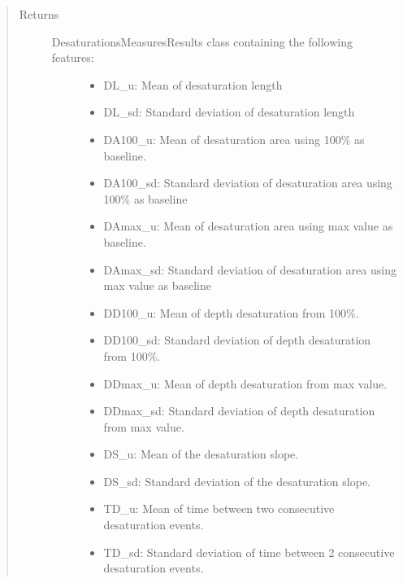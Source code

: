\documentclass[letterpaper,10pt,english]{sphinxmanual}
\begin{document}
\begin{fulllineitems}
\begin{fulllineitems}
\begin{quote}
\begin{description}
\item[{Returns}] \leavevmode
\begin{description}
\item[{DesaturationsMeasuresResults class containing the following features:}] \leavevmode\begin{itemize}
\item {} 
DL\_u: Mean of desaturation length

\item {} 
DL\_sd: Standard deviation of desaturation length

\item {} 
DA100\_u: Mean of desaturation area using 100\% as baseline.

\item {} 
DA100\_sd: Standard deviation of desaturation area using 100\% as baseline

\item {} 
DAmax\_u: Mean of desaturation area using max value as baseline.

\item {} 
DAmax\_sd: Standard deviation of desaturation area using max value as baseline

\item {} 
DD100\_u: Mean of depth desaturation from 100\%.

\item {} 
DD100\_sd: Standard deviation of depth desaturation from 100\%.

\item {} 
DDmax\_u: Mean of depth desaturation from max value.

\item {} 
DDmax\_sd: Standard deviation of depth desaturation from max value.

\item {} 
DS\_u: Mean of the desaturation slope.

\item {} 
DS\_sd: Standard deviation of the desaturation slope.

\item {} 
TD\_u: Mean of time between two consecutive desaturation events.

\item {} 
TD\_sd: Standard deviation of time between 2 consecutive desaturation events.

\end{itemize}

\end{description}



\end{description}
\end{quote}
\end{fulllineitems}
\end{fulllineitems}
\end{document}
